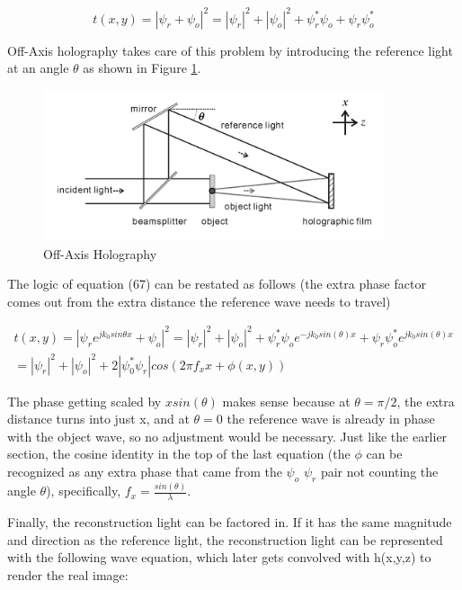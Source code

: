\documentclass[12pt]{article}
\begin{document}
\begin{equation}
	t(x,y) = |\psi_{r} + \psi_{o}|^2 = |\psi_{r}|^2 + |\psi_{o}|^2
	 + \psi_{r}^*\psi_{o} + \psi_{r}\psi_{o}^*
\end{equation}

Off-Axis holography takes care of this problem by introducing the reference
light at an angle \(\theta\) as shown in Figure \ref{fig:off-axis}.

\begin{figure}
    \centering
    \includegraphics[width=100mm]{tupac9.png}
    \caption{Off-Axis Holography}
    \label{fig:off-axis}
\end{figure}

The logic of equation (67) can be restated as follows (the extra phase factor comes out from the extra distance the reference wave needs to travel)

\begin{equation}
	\begin{multlined}
	t(x,y) = |\psi_{r}e^{jk_{0}sin\theta x} + \psi_{o}|^2 = |\psi_{r}|^2 + |\psi_{o}|^2
         + \psi_{r}^*\psi_{o}e^{-jk_{0}sin(\theta) x} + \psi_{r}\psi_{o}^*e^{jk_{0}sin(\theta)x}
	\\=|\psi_{r}|^2 + |\psi_{o}|^2 + 2|\psi_{0}^*\psi_{r}|cos(2\pi f_{x}x + \phi (x,y))
	\end{multlined}
\end{equation}

The phase getting scaled by \(xsin(\theta)\) makes sense because at \(\theta = \pi/2\), the extra distance turns into just x, and at \(\theta = 0\)
the reference wave is already in phase with the object wave, so no adjustment would be necessary. Just like the earlier section, the cosine identity in the top of the last equation (the \(\phi\) can be recognized as any extra phase that came from the \(\psi_{o}\) \(\psi_{r}\) pair not counting the angle \(\theta\)), specifically, \(f_{x} = \frac{sin(\theta)}{\lambda}\).

Finally, the reconstruction light can be factored in. If it has the same magnitude and direction as the reference light, the reconstruction light can be represented with the following wave equation, which later gets convolved with h(x,y,z) to render the real image:
\end{document}
